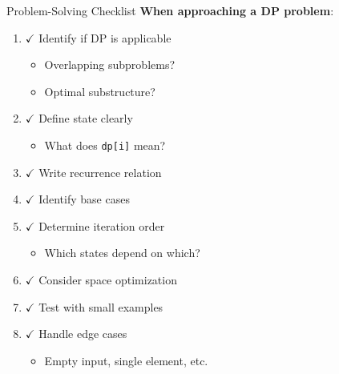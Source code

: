 \documentclass[aspectratio=169]{beamer}
\begin{document}
\begin{frame}{Problem-Solving Checklist}
  \textbf{When approaching a DP problem}:

  \vspace{0.3cm}

  \begin{enumerate}
    \item $\checkmark$ Identify if DP is applicable
    \begin{itemize}
      \item Overlapping subproblems?
      \item Optimal substructure?
    \end{itemize}

    \item $\checkmark$ Define state clearly
    \begin{itemize}
      \item What does \texttt{dp[i]} mean?
    \end{itemize}

    \item $\checkmark$ Write recurrence relation

    \item $\checkmark$ Identify base cases

    \item $\checkmark$ Determine iteration order
    \begin{itemize}
      \item Which states depend on which?
    \end{itemize}

    \item $\checkmark$ Consider space optimization

    \item $\checkmark$ Test with small examples

    \item $\checkmark$ Handle edge cases
    \begin{itemize}
      \item Empty input, single element, etc.
    \end{itemize}
  \end{enumerate}
\end{frame}
\end{document}
